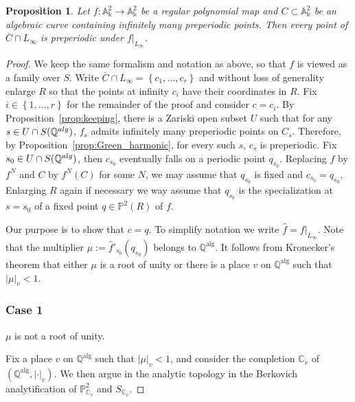 \documentclass[11 pt, oneside, a4paper]{amsart}
\newcommand{\C}{\mathbb{C}}
\newcommand{\Q}{\mathbb{Q}}
\newcommand{\A}{\mathbb{A}}
\renewcommand{\P}{\mathbb{P}}
\newcommand{\set}[1]{{\left\{#1\right\}}}
\newcommand{\nk}{\Bbbk}
\DeclareMathOperator{\alg}{alg}
\newtheorem{prop}[thm]{Proposition}
\theoremstyle{definition}
\theoremstyle{definition}
\begin{document}
\begin{prop}\label{prop:infinity_periodic}
Let   ${f}\colon \A^2_\nk \to \A^2_\nk$  be a regular polynomial map and $C\subset \A^2_\nk$ be an algebraic curve containing infinitely many preperiodic points. 
Then every point of $\overline C\cap L_\infty$ is preperiodic under $f|_{L_\infty}$. 
\end{prop}

\begin{proof}
We keep the same  formalism and notation 
 as above, so that $f$ is viewed as a family over $S$. Write 
 $\overline C\cap L_\infty = \set{c_1,\ldots, c_r}$  and without loss of generality enlarge $R$ so that 
 the points at infinity $c_i$ have their coordinates in $R$. Fix  $i\in \set{1, \ldots, r}$ for the remainder of the proof
  and consider $c = c_i$.
 By Proposition~\ref{prop:keeping}, there is a Zariski open subset $U$ such that for any $s\in U\cap S(\Q^{\rm alg})$, $f_s$ admits infinitely many preperiodic points on $C_s$. Therefore, 
 by Proposition~\ref{prop:Green_harmonic}, for every such $s$, $c_{s}$ is preperiodic.  Fix $s_0 \in U\cap S(\Q^{\rm alg})$, then 
 $c_{s_0}$ eventually falls on a periodic point $q_{s_0}$. Replacing $f$ by $f^N$ and $C$ by $f^N(C)$ for some $N$, we may 
 assume that $q_{s_0}$ is fixed and $c_{s_0}   = q_{s_0}$. 
 Enlarging $R$ again if necessary we way assume that $q_{s_0}$ is the specialization at $s=s_0$ of a fixed point $q\in \P^2(R)$ of $f$. 
 

 
Our purpose is to show that $c=q$. To simplify notation we write $\hat{f}= f|_{L_\infty}$. 
Note that the multiplier $\mu:= \hat{f}'_{s_0}(q_{s_0})$ belongs to $\Q^{\alg}$. 
It follows from Kronecker's theorem that either $\mu$ is a root of unity 
or there is a place $v$ on $\Q^{\alg}$ such that $|\mu|_v<1$.

\subsubsection*{Case 1}
$\mu$ is not a root of unity. 

Fix a place $v$ on $\Q^{\alg}$ such that  $|\mu|_v<1$, and consider the completion $\C_v$
of $(\Q^{\alg},|\cdot|_v)$. We then argue in the analytic topology
in the Berkovich analytification of $\P^2_{\C_v}$ and $S_{\C_v}$. 


\end{proof}
\end{document}
